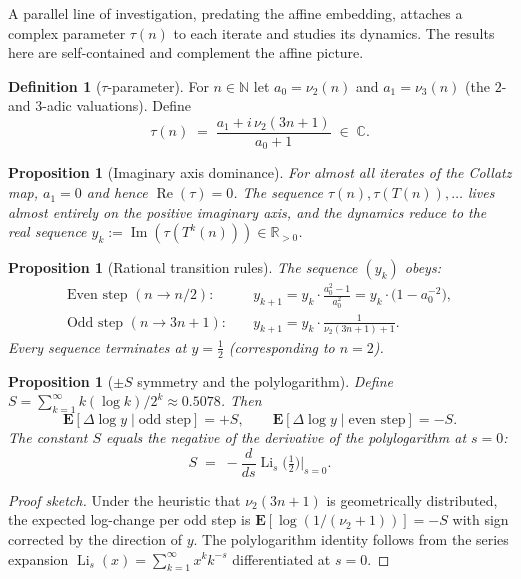 \documentclass[12pt, a4paper]{amsart}
\theoremstyle{plain}
\newtheorem{proposition}[theorem]{Proposition}
\theoremstyle{definition}
\newtheorem{definition}[theorem]{Definition}
\theoremstyle{remark}
\newcommand{\N}{\mathbb{N}}
\newcommand{\R}{\mathbb{R}}
\newcommand{\C}{\mathbb{C}}
\begin{document}
A parallel line of investigation, predating the affine embedding,
attaches a complex parameter $\tau(n)$ to each iterate and studies its
dynamics.  The results here are self-contained and complement the
affine picture.

\begin{definition}[$\tau$-parameter]
  For $n\in\N$ let $a_0=\nu_2(n)$ and $a_1=\nu_3(n)$ (the $2$- and
  $3$-adic valuations).  Define
  \[
    \tau(n) \;=\; \frac{a_1 + i\,\nu_2(3n+1)}{a_0+1} \;\in\; \C.
  \]
\end{definition}

\begin{proposition}[Imaginary axis dominance]
  For almost all iterates of the Collatz map, $a_1=0$ and hence
  $\operatorname{Re}(\tau)=0$.  The sequence $\tau(n), \tau(T(n)),\ldots$
  lives almost entirely on the positive imaginary axis, and the
  dynamics reduce to the real sequence
  $y_k := \operatorname{Im}(\tau(T^k(n))) \in \R_{>0}$.
\end{proposition}

\begin{proposition}[Rational transition rules]
  \label{prop:transition}
  The sequence $(y_k)$ obeys:
  \begin{align*}
    \text{Even step } (n\to n/2): &\quad
      y_{k+1} = y_k \cdot \frac{a_0^2-1}{a_0^2}
      = y_k \cdot \bigl(1 - a_0^{-2}\bigr), \\
    \text{Odd step } (n\to 3n+1): &\quad
      y_{k+1} = y_k \cdot \frac{1}{\nu_2(3n+1)+1}.
  \end{align*}
  Every sequence terminates at $y=\tfrac{1}{2}$ (corresponding to $n=2$).
\end{proposition}

\begin{proposition}[$\pm S$ symmetry and the polylogarithm]
  \label{prop:symmetry}
  Define $S = \sum_{k=1}^\infty k(\log k)/2^k \approx 0.5078$.  Then
  \[
    \mathbf{E}[\Delta\log y \mid \text{odd step}] = +S, \qquad
    \mathbf{E}[\Delta\log y \mid \text{even step}] = -S.
  \]
  The constant $S$ equals the negative of the derivative of the
  polylogarithm at $s=0$:
  \[
    S \;=\; -\frac{d}{ds}\operatorname{Li}_s\!\bigl(\tfrac{1}{2}\bigr)
            \bigg|_{s=0}.
  \]
\end{proposition}

\begin{proof}[Proof sketch]
  Under the heuristic that $\nu_2(3n+1)$ is geometrically distributed,
  the expected log-change per odd step is
  $\mathbf{E}[\log(1/(\nu_2+1))]=-S$ with sign corrected by the
  direction of $y$.  The polylogarithm identity follows from the series
  expansion $\operatorname{Li}_s(x)=\sum_{k=1}^\infty x^k k^{-s}$
  differentiated at $s=0$.
\end{proof}
\end{document}
